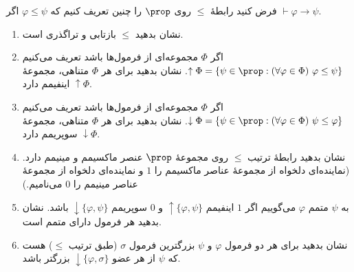 فرض کنید رابطهٔ
$\leq$
روی
$\prop$
را چنین تعریف کنیم که
$\varphi\leq\psi$
اگر
$\vdash\varphi\to\psi$.
\begin{enumerate}[label=(\alph*)]
    \item نشان بدهید
    $\leq$
    بازتابی و تراگذری است.
    \item اگر
    $\Phi$
    مجموعه‌ای از فرمول‌ها باشد تعریف می‌کنیم
    $\uparrow\Phi=\{\psi\in\prop : (\forall\varphi\in\Phi)\ \varphi\leq\psi\}$.
    نشان بدهید برای هر
    $\Phi$
    متناهی، مجموعهٔ
    $\uparrow\Phi$
    اینفیمم دارد.
    \item اگر
    $\Phi$
    مجموعه‌ای از فرمول‌ها باشد تعریف می‌کنیم
    $\downarrow\Phi=\{\psi\in\prop : (\forall\varphi\in\Phi)\ \psi\leq\varphi\}$.
    نشان بدهید برای هر
    $\Phi$
    متناهی، مجموعهٔ
    $\downarrow\Phi$
    سوپریمم دارد.
    \item نشان بدهید رابطهٔ ترتیب
    $\leq$
    روی مجموعهٔ
    $\prop$
    عنصر ماکسیمم و مینیمم دارد.
    (نماینده‌ای دلخواه از مجموعهٔ عناصر ماکسیمم را $1$ و نماینده‌ای دلخواه از مجموعهٔ عناصر مینیمم را $0$ می‌نامیم.)
    \item به
    $\psi$
    متمم
    $\varphi$
    می‌گوییم اگر
    $1$
    اینفیمم
    $\uparrow\{\varphi,\psi\}$
    و
    $0$
    سوپریمم
    $\downarrow\{\varphi,\psi\}$
    باشد. نشان بدهید هر فرمول دارای متمم است.
    \item نشان بدهید برای هر دو فرمول
    $\varphi$
    و
    $\psi$
    بزرگترین فرمول
    $\sigma$
    (طبق ترتیب $\leq$)
    هست که
    $\psi$
    از هر عضو
    $\downarrow\{\varphi,\sigma\}$
    بزرگتر باشد.
\end{enumerate}